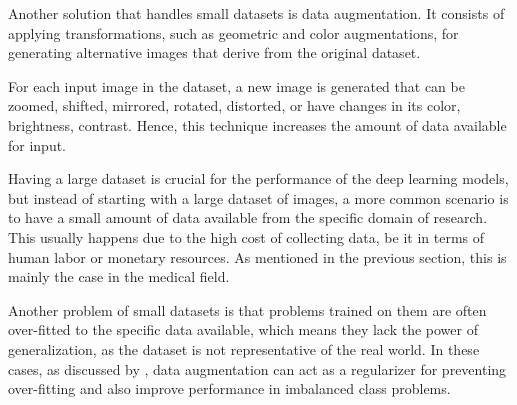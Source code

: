 Another solution that handles small datasets is data augmentation. It consists of applying transformations, such as geometric and color augmentations, for generating alternative images that derive from the original dataset.

For each input image in the dataset, a new image is generated that can be zoomed, shifted, mirrored, rotated, distorted, or have changes in its color, brightness, contrast. Hence, this technique increases the amount of data available for input. 

Having a large dataset is crucial for the performance of the deep learning models, but instead of starting with a large dataset of images, a more common scenario is to have a small amount of data available from the specific domain of research. This usually happens due to the high cost of collecting data, be it in terms of human labor or monetary resources. As mentioned in the previous section, this is mainly the case in the medical field. 

Another problem of small datasets is that problems trained on them are often over-fitted to the specific data available, which means they lack the power of generalization, as the dataset is not representative of the real world. In these cases, as discussed by \cite{abs-1712-04621}, data augmentation can act as a regularizer for preventing over-fitting and also improve performance in imbalanced class problems.

